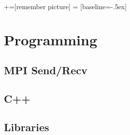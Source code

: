 %
%
%
%
%

\date{January 7 2008}



+=[remember picture]
 = [baseline=-.5ex]

\everymath{\displaystyle}

\subtitle{}

\begin{frame}
  \maketitle
\end{frame}

\begin{frame}
  \tableofcontents
\end{frame}


\section{Programming}
\label{sec:programming}

\subsection{MPI Send/Recv}
\label{sec:mpi-sendrecv}

\begin{frame}{}
  
\end{frame}

\subsection{C++}
\label{sec:c++}

\begin{frame}{}
  
\end{frame}

\subsection{Libraries}
\label{sec:libraries}

\begin{frame}{}
  
\end{frame}







